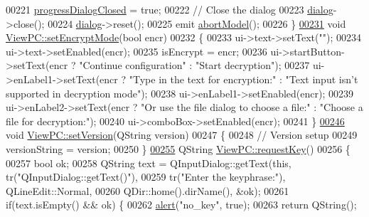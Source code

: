 \begin{DoxyCode}
00221     \hyperlink{class_view_p_c_add8c82aa2b0b934212aa5bde9277ab36}{progressDialogClosed} = \textcolor{keyword}{true};
00222     \textcolor{comment}{// Close the dialog}
00223     \hyperlink{class_view_p_c_a31abbb470fe329b44e6ffee202b903ca}{dialog}->close();
00224     \hyperlink{class_view_p_c_a31abbb470fe329b44e6ffee202b903ca}{dialog}->reset();
00225     emit \hyperlink{class_view_p_c_aa652102ce6b5757b8eef830409c8cabf}{abortModel}();
00226 \}
\hypertarget{viewpc_8cpp_source.tex_l00231}{}\hyperlink{class_view_p_c_a5b48951efefdc0e3039c9a4bf185320b}{00231} \textcolor{keywordtype}{void} \hyperlink{class_view_p_c_a5b48951efefdc0e3039c9a4bf185320b}{ViewPC::setEncryptMode}(\textcolor{keywordtype}{bool} encr)
00232 \{
00233     ui->text->setText(\textcolor{stringliteral}{""});
00234     ui->text->setEnabled(encr);
00235     isEncrypt = encr;
00236     ui->startButton->setText(encr ? \textcolor{stringliteral}{"Continue configuration"} : \textcolor{stringliteral}{"Start decryption"});
00237     ui->enLabel1->setText(encr ? \textcolor{stringliteral}{"Type in the text for encryption:"} : \textcolor{stringliteral}{"Text input isn't supported in
       decryption mode"});
00238     ui->enLabel1->setEnabled(encr);
00239     ui->enLabel2->setText(encr ? \textcolor{stringliteral}{"Or use the file dialog to choose a file:"} : \textcolor{stringliteral}{"Choose a file for
       decryption:"});
00240     ui->comboBox->setEnabled(encr);
00241 \}
\hypertarget{viewpc_8cpp_source.tex_l00246}{}\hyperlink{class_view_p_c_ac05220df875b7c4f24405a5742476ebf}{00246} \textcolor{keywordtype}{void} \hyperlink{class_view_p_c_ac05220df875b7c4f24405a5742476ebf}{ViewPC::setVersion}(QString version)
00247 \{
00248     \textcolor{comment}{// Version setup}
00249     versionString = version;
00250 \}
\hypertarget{viewpc_8cpp_source.tex_l00255}{}\hyperlink{class_view_p_c_a559c95675ec98b15451f3bca47033d9c}{00255} QString \hyperlink{class_view_p_c_a559c95675ec98b15451f3bca47033d9c}{ViewPC::requestKey}()
00256 \{
00257     \textcolor{keywordtype}{bool} ok;
00258     QString text = QInputDialog::getText(\textcolor{keyword}{this}, tr(\textcolor{stringliteral}{"QInputDialog::getText()"}),
00259                                          tr(\textcolor{stringliteral}{"Enter the keyphrase:"}), QLineEdit::Normal,
00260                                          QDir::home().dirName(), &ok);
00261     \textcolor{keywordflow}{if}(text.isEmpty() && ok) \{
00262         \hyperlink{class_view_p_c_a7c467169467789561078abc9d4fe57bd}{alert}(\textcolor{stringliteral}{"no\_key"}, \textcolor{keyword}{true});
00263         \textcolor{keywordflow}{return} QString();

\end{DoxyCode}
